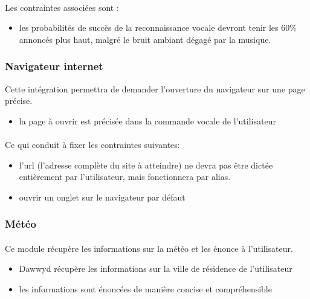 \documentclass[12pt]{article}
\begin{document}
    \paragraph{}
    Les contraintes associées sont :
    \begin{itemize}
        \item les probabilités de succès de la reconnaissance vocale devront
            tenir les 60\% annoncés plus haut, malgré le bruit ambiant dégagé
            par la musique.
    \end{itemize}

    \subsubsection{Navigateur internet}
    Cette intégration permettra de demander l'ouverture du navigateur sur une
    page précise.

    \begin{itemize}
        \item la page à ouvrir est précisée dans la commande vocale de l'utilisateur
    \end{itemize}

    \paragraph{}
    Ce qui conduit à fixer les contraintes suivantes:
    \begin{itemize}
        \item l'url (l'adresse complète du site à atteindre) ne devra pas être
            dictée entièrement par l'utilisateur, mais fonctionnera par alias.
        \item ouvrir un onglet sur le navigateur par défaut
    \end{itemize}

    \subsubsection{Météo}
    \paragraph{}
    Ce module récupère les informations sur la météo et les énonce à
    l'utilisateur.

    \begin{itemize}
        \item Dawwyd récupère les informations sur la ville de résidence de
            l'utilisateur
        \item les informations sont énoncées de manière concise et
            compréhensible
    \end{itemize}
\end{document}
